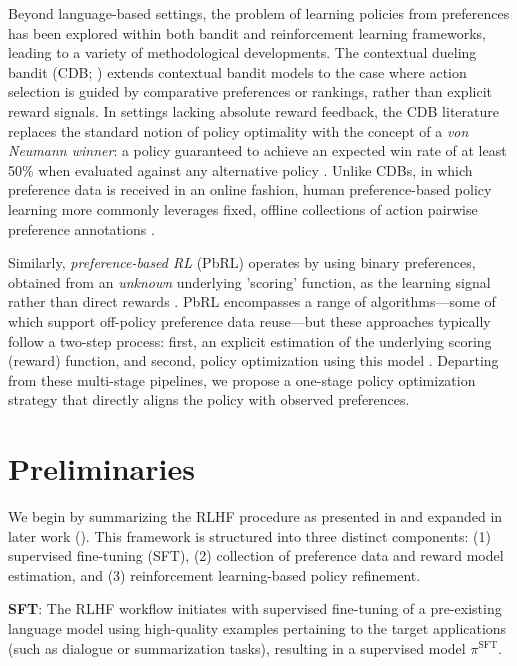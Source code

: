 Beyond language-based settings, the problem of learning policies from preferences has been explored within both bandit and reinforcement learning frameworks, leading to a variety of methodological developments. The contextual dueling bandit (CDB; \cite{yue2012karmed, dudik2015contextual}) extends contextual bandit models to the case where action selection is guided by comparative preferences or rankings, rather than explicit reward signals. In settings lacking absolute reward feedback, the CDB literature replaces the standard notion of policy optimality with the concept of a \textit{von Neumann winner}: a policy guaranteed to achieve an expected win rate of at least 50\% when evaluated against any alternative policy \citep{dudik2015contextual}. Unlike CDBs, in which preference data is received in an online fashion, human preference-based policy learning more commonly leverages fixed, offline collections of action pairwise preference annotations \citep{yan2022human}. 

Similarly, \textit{preference-based RL} (PbRL) operates by using binary preferences, obtained from an \textit{unknown} underlying 'scoring' function, as the learning signal rather than direct rewards \citep{BusaFekete2014, ruiz2023dueling}. PbRL encompasses a range of algorithms—some of which support off-policy preference data reuse—but these approaches typically follow a two-step process: first, an explicit estimation of the underlying scoring (reward) function, and second, policy optimization using this model \citep{jain2013learning, BusaFekete2014, christiano2017deep, sadigh2017active, kupcsik2018learning}. Departing from these multi-stage pipelines, we propose a one-stage policy optimization strategy that directly aligns the policy with observed preferences.

\section{Preliminaries}\label{section:prelims}

We begin by summarizing the RLHF procedure as presented in \citeauthor{ziegler2020finetuning} and expanded in later work (\citep{stiennon2022learning, bai2022training, ouyang2022training}). This framework is structured into three distinct components: (1) supervised fine-tuning (SFT), (2) collection of preference data and reward model estimation, and (3) reinforcement learning-based policy refinement.

\textbf{SFT}: The RLHF workflow initiates with supervised fine-tuning of a pre-existing language model using high-quality examples pertaining to the target applications (such as dialogue or summarization tasks), resulting in a supervised model $\pi^\text{SFT}$. 

